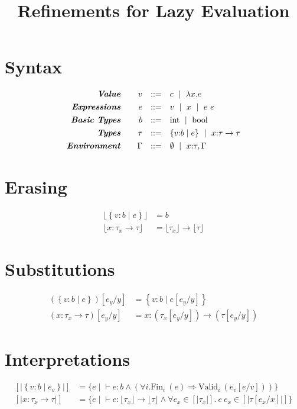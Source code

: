 \documentclass[10pt,a4paper]{article}
\title{Refinements for Lazy Evaluation}
\newcommand\efun[2]{\ensuremath{\lambda #1 . #2}}
\newcommand\eapp[2]{\ensuremath{#1 \ #2}}
\newcommand\tint{\ensuremath{\text{int}}}
\newcommand\tbool{\ensuremath{\text{bool}}}
\newcommand\tref[3]{\ensuremath{\left\lbrace #1 \colon #2 \mid #3 \right\rbrace}}
\newcommand\tfun[3]{\ensuremath{#1\colon #2 \rightarrow #3}}
\newcommand\validi[1]{\ensuremath{\text{Valid}_{i}\ (#1)}}
\newcommand\fini[1]{\ensuremath{\text{Fin}_{i}\ (#1)}}
\newcommand\generalconditionInterp[2]
	{\ensuremath{(\forall i. \fini{#1} \Rightarrow \validi{#2})}}
\newcommand\sub[2]{\ensuremath{\left[ #2 / #1 \right]}}
\newcommand\erase[1]{\ensuremath{\lfloor #1 \rfloor}}
\newcommand\interp[1]{\ensuremath{[|#1|]}}
\newcommand\hastype[3]{\ensuremath{#1 \vdash #2 \colon #3}}
\begin{document}
\section*{Syntax}
$$
\begin{array}{rrcl}
\emphbf{Value} \quad 
  & v
  & ::= 
  &   	 c 
  \spmid \efun{x}{e} 
  \\[0.05in] 


\emphbf{Expressions} \quad 
  & e
  & ::= 
  &   	 v 
  \spmid x 
  \spmid \eapp{e}{e}    
  \\[0.05in] 

\emphbf{Basic Types} \quad 
  & b
  & ::=  
  & 	\tint \spmid \tbool
  \\[0.05in] 

\emphbf{Types} \quad 
  & \tau
  & ::=  
  & 	\tref{v}{b}{e}
  \spmid \tfun{x}{\tau}{\tau}    
  \\[0.05in] 

\emphbf{Environment} \quad 
  & \Gamma
  & ::= 
  &     \emptyset \spmid x\colon \tau, \Gamma

\end{array}
$$



\section*{Erasing}
\begin{align*}
\erase{\tref{v}{b}{e}}&=b\\
\erase{\tfun{x}{\tau_x}{\tau}}&= \erase{\tau_x} \rightarrow \erase{\tau}
\end{align*}


\section*{Substitutions}
\begin{align*}
(\tref{v}{b}{e})\sub{y}{e_y} &=\tref{v}{b}{e\sub{y}{e_y}}\\
(\tfun{x}{\tau_x}{\tau})\sub{y}{e_y} &=\tfun{x}{(\tau_x\sub{y}{e_y})}{(\tau\sub{y}{e_y})}
\end{align*}

\section*{Interpretations}
\begin{align*}
\interp{\tref{v}{b}{e_v}} &= 
	\{e \mid \hastype{}{e}{b} 
	\land 
	\generalconditionInterp{e}{e_v\sub{v}{e}} 
	\}\\
\interp{\tfun{x}{\tau_x}{\tau}} &= 
	\{e \mid \hastype{}{e}{\erase{\tau_x} \rightarrow \erase{\tau}} 
	\land 
	\forall e_x \in \interp{\tau_x}. \
	 \eapp{e}{e_x} \in \interp{\tau\sub{x}{e_x}} 
	 \}
\end{align*}
\end{document}
